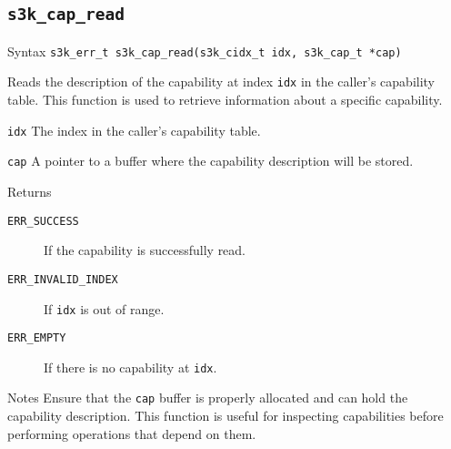 \documentclass[a4paper,11pt]{article}
\newcommand{\syscall}[1]{\texttt{#1}}
\newenvironment{syscalldoc}[1]{
  \subsection{\syscall{#1}} %
  \begin{tcolorbox}
  \begin{description}[leftmargin=!,style=nextline,noitemsep]
}{
  \end{description}
  \end{tcolorbox}
}
\begin{document}
\begin{syscalldoc}{s3k\_cap\_read}
  \item[Syntax] \lstinline{s3k_err_t s3k_cap_read(s3k_cidx_t idx, s3k_cap_t *cap)}
  \item[Description] Reads the description of the capability at index \verb|idx| in the caller's capability table. This function is used to retrieve information about a specific capability.
  \item[Parameters]
    \begin{description}
      \item[]
      \item[\texttt{idx}] The index in the caller's capability table.
      \item[\texttt{cap}] A pointer to a buffer where the capability description will be stored.
    \end{description}
  \item[Returns]
    \begin{description}
      \item[]
      \item[\texttt{ERR\_SUCCESS}] If the capability is successfully read.
      \item[\texttt{ERR\_INVALID\_INDEX}] If \verb|idx| is out of range.
      \item[\texttt{ERR\_EMPTY}] If there is no capability at \verb|idx|.
    \end{description}
  \item[Notes] Ensure that the \verb|cap| buffer is properly allocated and can hold the capability description. This function is useful for inspecting capabilities before performing operations that depend on them.
\end{syscalldoc}
\end{document}
